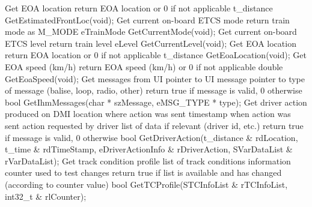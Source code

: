 \documentclass{template/openetcs_article}
\begin{document}
\newline
\newline Get EOA location
\newline return EOA location or 0 if not applicable
\newline t\_distance GetEstimatedFrontLoc(void);
\newline
\newline Get current on-board ETCS mode
\newline return train mode as M\_MODE
\newline eTrainMode GetCurrentMode(void);
\newline
\newline Get current on-board ETCS level
\newline return train level
\newline eLevel GetCurrentLevel(void);
\newline
\newline Get EOA location
\newline return EOA location or 0 if not applicable
\newline t\_distance GetEoaLocation(void);
\newline
\newline Get EOA speed (km/h)
\newline return EOA speed (km/h) or 0 if not applicable
\newline double GetEoaSpeed(void);
\newline
\newline Get messages from UI
\newline [out] pointer to UI message
\newline [out] pointer to type of message (balise, loop, radio, other)
\newline return true if message is valid, 0 otherwise
\newline bool GetIhmMessages(char * szMessage, eMSG\_TYPE * type);
\newline
\newline Get driver action produced on DMI
\newline [out] location where action was sent
\newline [out] timestamp when action was sent
\newline [out] action requested by driver
\newline [out] list of data if relevant (driver id, etc.)
\newline return true if message is valid, 0 otherwise
\newline bool GetDriverAction(t\_distance \& rdLocation, t\_time \& rdTimeStamp, eDriverActionInfo \&  rDriverAction, SVarDataList \& rVarDataList);
\newline 
\newline Get track condition profile
\newline [out] list of track conditions information
\newline [in/out] counter used to test changes
\newline return true if list is available and has changed (according to counter value)
\newline bool GetTCProfile(STCInfoList \& rTCInfoList, int32\_t \& rlCounter);
\end{document}

